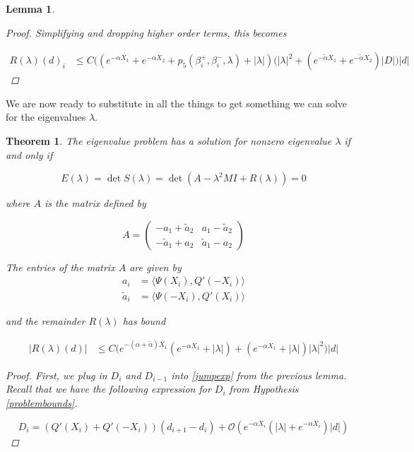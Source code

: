 \documentclass[12pt]{article}
\newtheorem{lemma}{Lemma}
\newtheorem{theorem}{Theorem}
\begin{document}
\begin{lemma}
\begin{proof}
Simplifying and dropping higher order terms, this becomes

\begin{align*}
R(\lambda)(d)_i &\leq C \Big( ( e^{-\alpha X_1} + e^{-\alpha X_2} + p_5(\beta_i^+, \beta_i^-, \lambda) + |\lambda|  )(|\lambda|^2 + (e^{-\tilde{\alpha}X_1} + e^{-\tilde{\alpha}X_2}) |D|\Big) |d|
\end{align*}

\end{proof}
\end{lemma}

We are now ready to substitute in all the things to get something we can solve for the eigenvalues $\lambda$.

\begin{theorem}

The eigenvalue problem has a solution for nonzero eigenvalue $\lambda$ if and only if

\begin{equation}\label{matrixdet}
E(\lambda) = \det S(\lambda) = \det(A - \lambda^2 MI + R(\lambda) ) = 0
\end{equation}

where $A$ is the matrix defined by

\[
A = 
\begin{pmatrix}
-a_1 + \tilde{a}_2 & a_1 - \tilde{a}_2 \\
-\tilde{a}_1 + a_2 & \tilde{a}_1 - a_2 
\end{pmatrix}
\]

The entries of the matrix $A$ are given by
\begin{align*}
a_i &= \langle \Psi (X_i), Q'(-X_i) \rangle \\
\tilde{a}_i &= \langle \Psi(-X_i), Q'(X_i) \rangle
\end{align*}

and the remainder $R(\lambda)$ has bound

\begin{align*}
|R(\lambda)(d)| &\leq C \Big( e^{-(\alpha + \tilde{\alpha})X_1}( e^{-\alpha X_1} + |\lambda|  )  
+ (e^{-\alpha X_1} + |\lambda| ) |\lambda|^2 \Big) |d|
\end{align*}

\begin{proof}

First, we plug in $D_i$ and $D_{i-1}$ into \eqref{jumpexp} from the previous lemma. 
Recall that we have the following expression for $D_i$ from Hypothesis \ref{problembounds}.

\[
D_i = ( Q'(X_i) + Q'(-X_i))(d_{i+1} - d_i ) + \mathcal{O} \left( e^{-\alpha X_i} \left( |\lambda| +  e^{-\alpha X_i}  \right) |d| \right)
\]


\end{proof}
\end{theorem}
\end{document}
